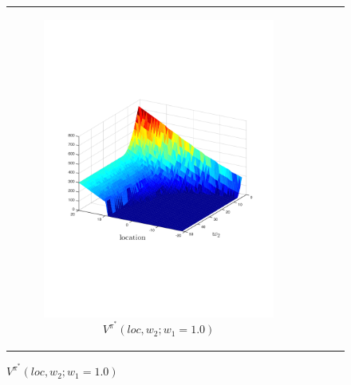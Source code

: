{\centering
    \begin{figure}[ht]
        \begin{tabular}{cccc}
            \begin{subfigure}{0.24\textwidth}\centering\includegraphics[width=1.0\linewidth]{images/robot_vf_new}\caption{{\footnotesize $V^{\pi^{*}}(loc, w_2; w_1 = 1.0)$} }\label{fig:navigation_vf}\end{subfigure}&

\end{tabular}
\end{figure}}
